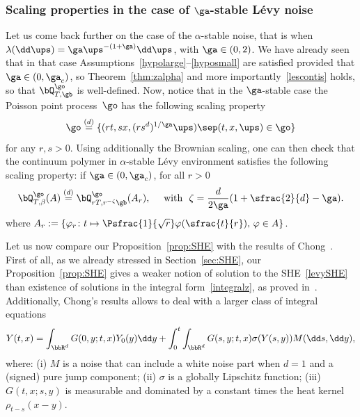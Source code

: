 \subsubsection{Scaling properties in the case of $\ga$-stable Lévy noise}
Let us come back further on the case
of the $\alpha$-stable noise,
that is when $\lambda(\dd \ups) = \ga \ups^{-(1+\ga)} \dd \ups$, with $\ga\in (0,2)$.
We have already seen that in that case Assumptions~\eqref{hypolarge}--\eqref{hyposmall} are satisfied provided that $\ga\in (0,\ga_c)$, so Theorem~\ref{thm:zalpha} and more importantly~\eqref{lescontis} holds, so that $\bQ_{T,\gb}^{\go}$ is well-defined.
Now, notice that in the $\ga$-stable case the Poisson point process~$\go$ has the following scaling property\vspace*{-3pt}
\[
\go \stackrel{(d)}{=} \{ (r t, s x, (rs^d)^{1/\ga} \ups) \sep (t,x,\ups)\in \go \}
\]
for any $r,s>0$.
Using additionally the Brownian scaling,
one can then check that
the continuum polymer in $\alpha$-stable Lévy environment
satisfies the following
scaling property: if $\ga\in (0,\ga_c)$, for all $r>0$
\begin{equation}\label{scaling}
\bQ^{\go }_{T, \beta} (A) \stackrel{(d)}{=} \bQ_{r T, r^{-\zeta}\gb }^{\go} (A_r), \quad \text{ with }\ \zeta=\frac{d}{2\ga} (1 +\sfrac{2}{d} - \ga).
\end{equation}
where $A_r := \{ \varphi_r\colon t\mapsto \Psfrac{1}{\sqrt{r}} \varphi(\sfrac{t}{r}),\, \varphi\in A \}$.

Let us now compare our Proposition~\ref{prop:SHE}
with the results of Chong~\cite{Chong17}.
First of all, as we already stressed in Section~\ref{sec:SHE},
our Proposition~\ref{prop:SHE} gives a weaker
notion of solution to the SHE~\eqref{levySHE}
than existence of solutions in the integral form~\eqref{integralz}, as proved in~\cite{Chong17}.
Additionally,
Chong's results allows to deal with a larger class of integral equations
\begin{equation}
\label{SHEchong}
Y(t,x) = \int_{\bbR^d} G(0,y; t,x)Y_0(y)\dd y + \int_0^t \int_{\bbR^d} G(s,y ; t,x) \sigma(Y(s,y)) M(\dd s,\dd y),
\end{equation}
where: (i) $M$ is a noise that can include a white noise part when $d=1$ and a (signed) pure jump component;
(ii) $\sigma$ is a globally Lipschitz function;
(iii) $G(t,x; s,y)$ is measurable and dominated by a constant times the heat kernel $\rho_{t-s}(x-y)$.

